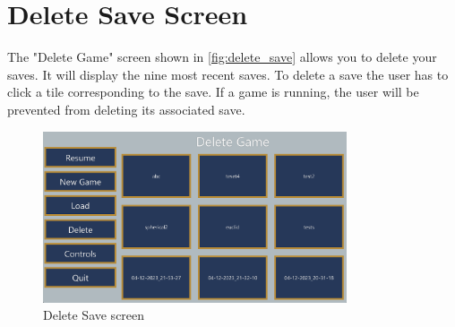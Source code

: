 \section{Delete Save Screen} \label{delete_save_screen}
The "Delete Game" screen shown in \autoref{fig:delete_save} allows you to delete your saves.
It will display the nine most recent saves.
To delete a save the user has to click a tile corresponding to the save.
If a game is running, the user will be prevented from deleting its associated save.

\begin{figure}[h]
    \centering
    \includegraphics[width=0.8\textwidth]{chapters/user_manual/resources/delete-game.png}
    \caption{Delete Save screen}
    \label{fig:delete_save}
\end{figure}